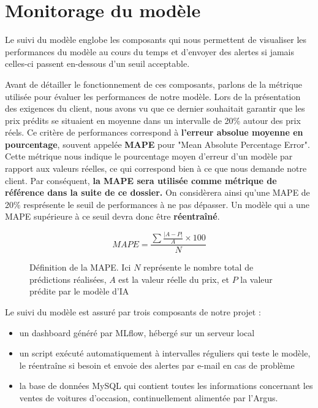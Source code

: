 \documentclass[french]{article}
\begin{document}
    \section{Monitorage du modèle}

    Le suivi du modèle englobe les composants qui nous permettent de visualiser les performances du modèle au cours du temps et d'envoyer des alertes si jamais celles-ci passent en-dessous d'un seuil acceptable. 
    
    Avant de détailler le fonctionnement de ces composants, parlons de la métrique utilisée pour évaluer les performances de notre modèle. Lors de la présentation des exigences du client, nous avons vu que ce dernier souhaitait garantir que les prix prédits se situaient en moyenne dans un intervalle de 20\% autour des prix réels. Ce critère de performances correspond à \textbf{l'erreur absolue moyenne en pourcentage}, souvent appelée \textbf{MAPE} pour "Mean Absolute Percentage Error". Cette métrique nous indique le pourcentage moyen d'erreur d'un modèle par rapport aux valeurs réelles, ce qui correspond bien à ce que nous demande notre client. Par conséquent, \textbf{la MAPE sera utilisée comme métrique de référence dans la suite de ce dossier.} On considèrera ainsi qu'une MAPE de 20\% resprésente le seuil de performances à ne pas dépasser. Un modèle qui a une MAPE supérieure à ce seuil devra donc être \textbf{réentraîné}.

    \begin{figure}[h!]
        \begin{equation}MAPE = \frac {\sum \frac{\lvert A-P \rvert}{A} \times 100}{N}  \end{equation}
        \centering
        \caption{Définition de la MAPE. Ici $N$ représente le nombre total de prédictions réalisées, $A$ est la valeur réelle du prix, et $P$ la valeur prédite par le modèle d'IA}
        \centering
    \end{figure}

    Le suivi du modèle est assuré par trois composants de notre projet :
    \begin{itemize}
        \item un dashboard généré par MLflow, hébergé sur un serveur local
        \item un script exécuté automatiquement à intervalles réguliers qui teste le modèle, le réentraîne si besoin et envoie des alertes par e-mail en cas de problème
        \item la base de données MySQL qui contient toutes les informations concernant les ventes de voitures d'occasion, continuellement alimentée par l'Argus.
    \end{itemize}
\end{document}
